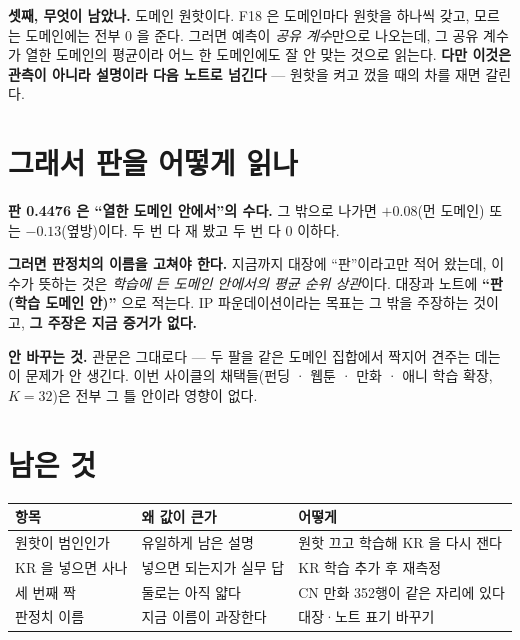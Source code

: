 \documentclass[11pt]{article}
\begin{document}
\textbf{셋째, 무엇이 남았나.} 도메인 원핫이다. F18 은 도메인마다 원핫을
하나씩 갖고, 모르는 도메인에는 전부 0 을 준다. 그러면 예측이 \emph{공유
계수}만으로 나오는데, 그 공유 계수가 열한 도메인의 평균이라 어느 한
도메인에도 잘 안 맞는 것으로 읽는다. \textbf{다만 이것은 관측이 아니라
설명이라 다음 노트로 넘긴다} --- 원핫을 켜고 껐을 때의 차를 재면 갈린다.

\section{그래서 판을 어떻게 읽나}

\textbf{판 0.4476 은 ``열한 도메인 안에서''의 수다.} 그 밖으로 나가면
$+0.08$(먼 도메인) 또는 $-0.13$(옆방)이다. 두 번 다 재 봤고 두 번 다
0 이하다.

\textbf{그러면 판정치의 이름을 고쳐야 한다.} 지금까지 대장에 ``판''이라고만
적어 왔는데, 이 수가 뜻하는 것은 \emph{학습에 든 도메인 안에서의 평균
순위 상관}이다. 대장과 노트에 \textbf{``판(학습 도메인 안)''} 으로 적는다.
IP 파운데이션이라는 목표는 그 밖을 주장하는 것이고, \textbf{그 주장은 지금
증거가 없다.}

\textbf{안 바꾸는 것.} 관문은 그대로다 --- 두 팔을 같은 도메인 집합에서
짝지어 견주는 데는 이 문제가 안 생긴다. 이번 사이클의 채택들(펀딩 · 웹툰 ·
만화 · 애니 학습 확장, $K{=}32$)은 전부 그 틀 안이라 영향이 없다.

\section{남은 것}

\begin{center}
\begin{tabular}{lll}
\hline
항목 & 왜 값이 큰가 & 어떻게 \\
\hline
원핫이 범인인가 & 유일하게 남은 설명 & 원핫 끄고 학습해 KR 을 다시 잰다 \\
KR 을 넣으면 사나 & 넣으면 되는지가 실무 답 & KR 학습 추가 후 재측정 \\
세 번째 짝 & 둘로는 아직 얇다 & CN 만화 352행이 같은 자리에 있다 \\
판정치 이름 & 지금 이름이 과장한다 & 대장·노트 표기 바꾸기 \\
\hline
\end{tabular}
\end{center}
\end{document}
